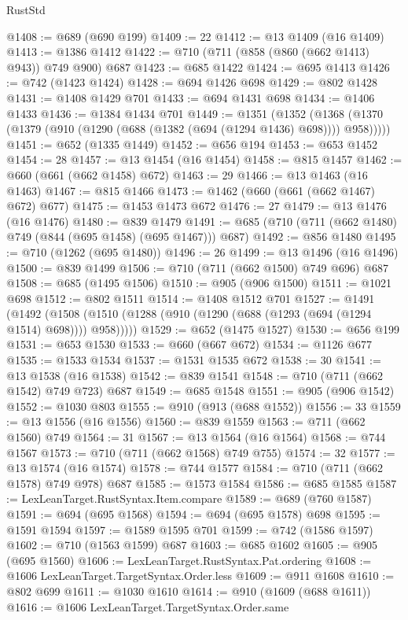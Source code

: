 \begin{lexlean}{RustStd}
\begin{coremodule}
@1408 := @689 (@690 @199)
@1409 := 22
@1412 := @13 @1409 (@16 @1409)
@1413 := @1386 @1412
@1422 := @710 (@711 (@858 (@860 (@662 @1413) @943)) @749 @900) @687
@1423 := @685 @1422
@1424 := @695 @1413
@1426 := @742 (@1423 @1424)
@1428 := @694 @1426 @698
@1429 := @802 @1428
@1431 := @1408 @1429 @701
@1433 := @694 @1431 @698
@1434 := @1406 @1433
@1436 := @1384 @1434 @701
@1449 := @1351
    (@1352 (@1368 (@1370 (@1379 (@910 (@1290 (@688 (@1382 (@694 (@1294 @1436) @698)))) @958)))))
@1451 := @652 (@1335 @1449)
@1452 := @656 @194
@1453 := @653 @1452
@1454 := 28
@1457 := @13 @1454 (@16 @1454)
@1458 := @815 @1457
@1462 := @660 (@661 (@662 @1458) @672)
@1463 := 29
@1466 := @13 @1463 (@16 @1463)
@1467 := @815 @1466
@1473 := @1462 (@660 (@661 (@662 @1467) @672) @677)
@1475 := @1453 @1473 @672
@1476 := 27
@1479 := @13 @1476 (@16 @1476)
@1480 := @839 @1479
@1491 := @685 (@710 (@711 (@662 @1480) @749 (@844 (@695 @1458) (@695 @1467))) @687)
@1492 := @856 @1480
@1495 := @710 (@1262 (@695 @1480))
@1496 := 26
@1499 := @13 @1496 (@16 @1496)
@1500 := @839 @1499
@1506 := @710 (@711 (@662 @1500) @749 @696) @687
@1508 := @685 (@1495 @1506)
@1510 := @905 (@906 @1500)
@1511 := @1021 @698
@1512 := @802 @1511
@1514 := @1408 @1512 @701
@1527 := @1491
    (@1492 (@1508 (@1510 (@1288 (@910 (@1290 (@688 (@1293 (@694 (@1294 @1514) @698)))) @958)))))
@1529 := @652 (@1475 @1527)
@1530 := @656 @199
@1531 := @653 @1530
@1533 := @660 (@667 @672)
@1534 := @1126 @677
@1535 := @1533 @1534
@1537 := @1531 @1535 @672
@1538 := 30
@1541 := @13 @1538 (@16 @1538)
@1542 := @839 @1541
@1548 := @710 (@711 (@662 @1542) @749 @723) @687
@1549 := @685 @1548
@1551 := @905 (@906 @1542)
@1552 := @1030 @803
@1555 := @910 (@913 (@688 @1552))
@1556 := 33
@1559 := @13 @1556 (@16 @1556)
@1560 := @839 @1559
@1563 := @711 (@662 @1560) @749
@1564 := 31
@1567 := @13 @1564 (@16 @1564)
@1568 := @744 @1567
@1573 := @710 (@711 (@662 @1568) @749 @755)
@1574 := 32
@1577 := @13 @1574 (@16 @1574)
@1578 := @744 @1577
@1584 := @710 (@711 (@662 @1578) @749 @978) @687
@1585 := @1573 @1584
@1586 := @685 @1585
@1587 := LexLeanTarget.RustSyntax.Item.compare
@1589 := @689 (@760 @1587)
@1591 := @694 (@695 @1568)
@1594 := @694 (@695 @1578) @698
@1595 := @1591 @1594
@1597 := @1589 @1595 @701
@1599 := @742 (@1586 @1597)
@1602 := @710 (@1563 @1599) @687
@1603 := @685 @1602
@1605 := @905 (@695 @1560)
@1606 := LexLeanTarget.RustSyntax.Pat.ordering
@1608 := @1606 LexLeanTarget.TargetSyntax.Order.less
@1609 := @911 @1608
@1610 := @802 @699
@1611 := @1030 @1610
@1614 := @910 (@1609 (@688 @1611))
@1616 := @1606 LexLeanTarget.TargetSyntax.Order.same

\end{coremodule}
\end{lexlean}
